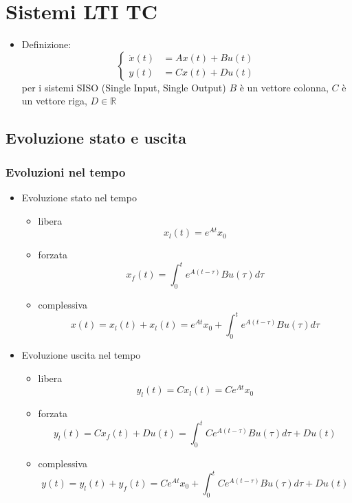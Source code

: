 \documentclass[11pt]{article}
\begin{document}
\section{Sistemi LTI TC}
\label{sec:org4e59118}
\begin{itemize}
\item Definizione:
\[\begin{cases}
	  \dot{x}(t) &= Ax(t) + Bu(t) \\
	  y(t) &= Cx(t) + Du(t)
	  \end{cases} \]
per i sistemi SISO (Single Input, Single Output) \(B\) è un vettore colonna,
\(C\) è un vettore riga, \(D \in \mathbb{R}\)
\end{itemize}

\subsection{Evoluzione stato e uscita}
\label{sec:orgba817b5}
\subsubsection{Evoluzioni nel tempo}
\label{sec:org46addc2}
\begin{itemize}
\item Evoluzione stato nel tempo
\begin{itemize}
\item libera
\[x_l (t) = e^{At} x_0\]
\item forzata
\[x_f (t) = \int_{0}^{t} e^{A(t-\tau)} Bu(\tau) d \tau\]
\item complessiva
\[ x(t) = x_l (t) + x_l (t) =
	    e^{At} x_0 + \int_{0}^{t} e^{A(t-\tau)} Bu(\tau) d \tau \]
\end{itemize}

\item Evoluzione uscita nel tempo
\begin{itemize}
\item libera
\[y_l (t) = C x_l (t) = Ce^{At} x_0\]
\item forzata
\[y_l (t) = C x_f (t) + D u(t) =
	    \int_{0}^{t} C e^{A(t-\tau)} Bu(\tau) d \tau + D u(t) \]
\item complessiva
\[y(t) = y_l (t) + y_f (t) = C e^{At} x_0 +
	    \int_{0}^{t} C e^{A(t-\tau)} Bu(\tau) d \tau + D u(t) \]
\end{itemize}
\end{itemize}
\end{document}
